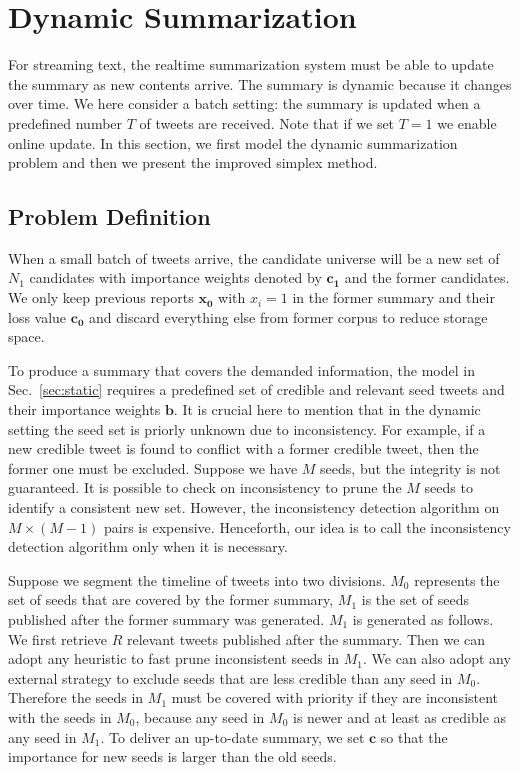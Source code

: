 \documentclass{llncs}
\begin{document}
\section{Dynamic Summarization}\label{sec:dynamic}
For streaming text, the realtime summarization system must be able to update the summary as new contents arrive. The summary is dynamic because it changes over time. We here consider a batch setting: the summary is updated when a predefined number $T$ of tweets are received. Note that if we set $T=1$ we enable online update.  In this section, we first model the dynamic summarization problem and then we present the improved simplex method.

\subsection{Problem Definition}
When a small batch of tweets arrive, the candidate universe will be a new set of $N_1 $ candidates with importance weights denoted by $\mathbf{c_1}$ and the former candidates. We only keep previous reports $\mathbf{x_0}$ with $x_i=1$ in the former summary and their loss value $\mathbf{c_0}$  and discard everything else from former corpus to reduce storage space.

To produce a summary that covers the demanded information, the model in Sec.~\ref{sec:static} requires a predefined set of credible and relevant seed tweets and their importance weights $\mathbf{b}$. It is crucial here to mention that in the dynamic setting the seed set is priorly unknown due to inconsistency. For example, if a new credible tweet is found to conflict with a former credible tweet, then the former one must be excluded. Suppose we have $M$ seeds, but the integrity is not guaranteed. It is possible to check on inconsistency to prune the $M$ seeds to identify a consistent new set. However, the inconsistency detection algorithm on $M\times (M-1)$ pairs is expensive. Henceforth, our idea is to call the inconsistency detection algorithm only when it is necessary. 

Suppose we segment the timeline of tweets into two divisions. $M_0$ represents the set of seeds that are covered by the former summary, $M_1$ is the set of seeds published after the former summary was generated. $M_1$ is generated as follows. We first retrieve $R$ relevant tweets published after the summary. Then we can adopt any heuristic to fast prune inconsistent seeds in $M_1$. We can also adopt any external strategy to exclude seeds that are less credible than any seed in $M_0$. Therefore the seeds in $M_1$ must be covered with priority if they are inconsistent with the seeds in $M_0$, because any seed in  $M_0$ is newer and at least as credible as any seed in $M_1$.  To deliver an up-to-date summary, we set $\mathbf{c}$ so that the importance for new seeds is larger than the old seeds.
\end{document}
